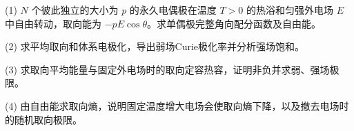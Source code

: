 (1) \(N\) 个彼此独立的大小为 \(p\) 的永久电偶极在温度 \(T>0\) 的热浴和匀强外电场 \(E\) 中自由转动，取向能为 \(-pE\cos\theta\)。求单偶极完整角向配分函数及自由能。

(2) 求平均取向和体系电极化，导出弱场Curie极化率并分析强场饱和。

(3) 求取向平均能量与固定外电场时的取向定容热容，证明非负并求弱、强场极限。

(4) 由自由能求取向熵，说明固定温度增大电场会使取向熵下降，以及撤去电场时的随机取向极限。
